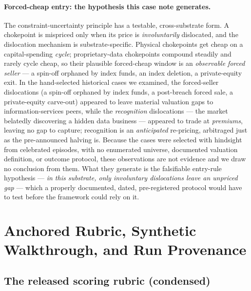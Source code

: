 \documentclass[11pt]{article}
\begin{document}
\paragraph{Forced-cheap entry: the hypothesis this case note generates.} The
constraint-uncertainty principle has a testable, cross-substrate form. A chokepoint
is mispriced only when its price is \emph{involuntarily} dislocated, and the dislocation
mechanism is substrate-specific. Physical chokepoints get cheap on a capital-spending
\emph{cycle}; proprietary-data chokepoints compound steadily and rarely cycle cheap, so
their plausible forced-cheap window is an \emph{observable forced seller} --- a spin-off
orphaned by index funds, an index deletion, a private-equity exit. In the hand-selected
historical cases we examined, the forced-seller dislocations (a spin-off orphaned by index
funds, a post-breach forced sale, a private-equity carve-out) appeared to leave material
valuation gaps to information-services peers, while the \emph{recognition} dislocations
--- the market belatedly discovering a hidden data business --- appeared to trade at
\emph{premiums}, leaving no gap to capture; recognition is an \emph{anticipated}
re-pricing, arbitraged just as the pre-announced halving is. Because the cases were
selected with hindsight from celebrated episodes, with no enumerated universe, documented
valuation definition, or outcome protocol, these observations are not evidence and we
draw no conclusion from them. What they generate is the falsifiable entry-rule
hypothesis --- \emph{in this substrate, only involuntary dislocations leave an unpriced
gap} --- which a properly documented, dated, pre-registered protocol would have to test
before the framework could rely on it.


\section{Anchored Rubric, Synthetic Walkthrough, and Run Provenance}
\label{app:rubric-walkthrough}

\subsection*{The released scoring rubric (condensed)}
\end{document}
